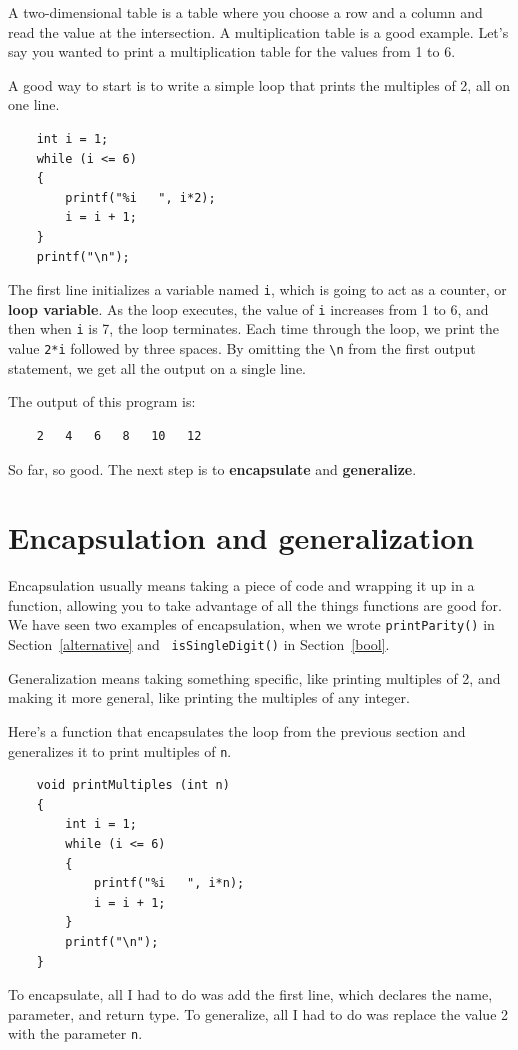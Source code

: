 A two-dimensional table is a table where you choose a row and
a column and read the value at the intersection.  A multiplication
table is a good example.  Let's say you wanted to print a
multiplication table for the values from 1 to 6.

A good way to start is to write a simple loop that prints
the multiples of 2, all on one line.

\begin{verbatim}
    int i = 1;
    while (i <= 6) 
    {
        printf("%i   ", i*2);
        i = i + 1;
    }
    printf("\n");
\end{verbatim}
%
The first line initializes a variable named {\tt i}, which is
going to act as a counter, or {\bf loop variable}.  As the
loop executes, the value of {\tt i} increases from 1 to 6,
and then when {\tt i} is 7, the loop terminates.  Each
time through the loop, we print the value {\tt 2*i} followed
by three spaces.  By omitting the  \verb+\n+ from the
first output statement, we get 
all the output on a single line.


The output of this program is:

\begin{verbatim}
    2   4   6   8   10   12
\end{verbatim}
%
So far, so good.  The next step is to {\bf encapsulate} and {\bf
generalize}.

\section {Encapsulation and generalization}

Encapsulation usually means taking a piece of code and wrapping it up
in a function, allowing you to take advantage of all the things functions
are good for.  We have seen two examples of encapsulation, when we
wrote {\tt printParity()} in Section~\ref{alternative} and {\tt
isSingleDigit()} in Section~\ref{bool}.

Generalization means taking something specific, like printing
multiples of 2, and making it more general, like printing the
multiples of any integer.


Here's a function that encapsulates the loop from the previous
section and generalizes it to print multiples of {\tt n}.

\begin{verbatim}
    void printMultiples (int n)
    {
        int i = 1;
        while (i <= 6) 
        {
            printf("%i   ", i*n);
            i = i + 1;
        }
        printf("\n");
    }
\end{verbatim}
%
To encapsulate, all I had to do was add the first line,
which declares the name, parameter,
and return type.  To generalize, all I had to do was replace
the value 2 with the parameter {\tt n}.

